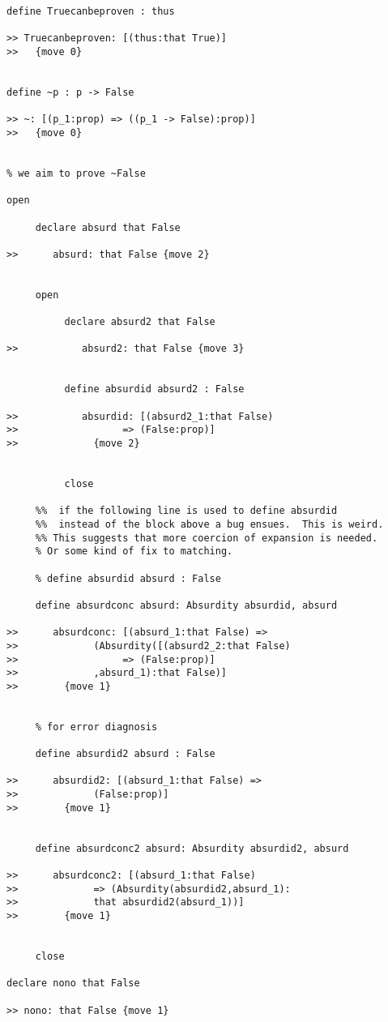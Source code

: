 \documentclass[12pt]{article}
\begin{document}
\begin{verbatim}
define Truecanbeproven : thus

>> Truecanbeproven: [(thus:that True)]
>>   {move 0}


define ~p : p -> False

>> ~: [(p_1:prop) => ((p_1 -> False):prop)]
>>   {move 0}


% we aim to prove ~False

open

     declare absurd that False

>>      absurd: that False {move 2}


     open

          declare absurd2 that False

>>           absurd2: that False {move 3}


          define absurdid absurd2 : False

>>           absurdid: [(absurd2_1:that False) 
>>                  => (False:prop)]
>>             {move 2}


          close

     %%  if the following line is used to define absurdid
     %%  instead of the block above a bug ensues.  This is weird.
     %% This suggests that more coercion of expansion is needed.  
     % Or some kind of fix to matching.

     % define absurdid absurd : False

     define absurdconc absurd: Absurdity absurdid, absurd

>>      absurdconc: [(absurd_1:that False) => 
>>             (Absurdity([(absurd2_2:that False) 
>>                  => (False:prop)]
>>             ,absurd_1):that False)]
>>        {move 1}


     % for error diagnosis

     define absurdid2 absurd : False

>>      absurdid2: [(absurd_1:that False) => 
>>             (False:prop)]
>>        {move 1}


     define absurdconc2 absurd: Absurdity absurdid2, absurd

>>      absurdconc2: [(absurd_1:that False) 
>>             => (Absurdity(absurdid2,absurd_1):
>>             that absurdid2(absurd_1))]
>>        {move 1}


     close

declare nono that False

>> nono: that False {move 1}



\end{verbatim}
\end{document}
